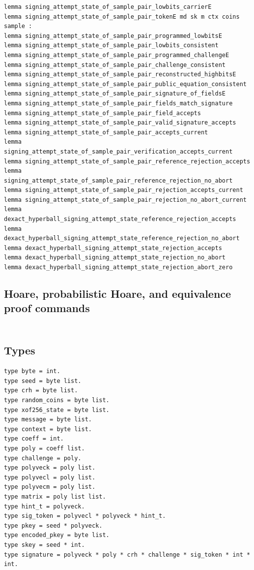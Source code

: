 \begin{lstlisting}[language=EasyCrypt,basicstyle=\ttfamily\tiny]
lemma signing_attempt_state_of_sample_pair_lowbits_carrierE
lemma signing_attempt_state_of_sample_pair_tokenE md sk m ctx coins sample :
lemma signing_attempt_state_of_sample_pair_programmed_lowbitsE
lemma signing_attempt_state_of_sample_pair_lowbits_consistent
lemma signing_attempt_state_of_sample_pair_programmed_challengeE
lemma signing_attempt_state_of_sample_pair_challenge_consistent
lemma signing_attempt_state_of_sample_pair_reconstructed_highbitsE
lemma signing_attempt_state_of_sample_pair_public_equation_consistent
lemma signing_attempt_state_of_sample_pair_signature_of_fieldsE
lemma signing_attempt_state_of_sample_pair_fields_match_signature
lemma signing_attempt_state_of_sample_pair_field_accepts
lemma signing_attempt_state_of_sample_pair_valid_signature_accepts
lemma signing_attempt_state_of_sample_pair_accepts_current
lemma signing_attempt_state_of_sample_pair_verification_accepts_current
lemma signing_attempt_state_of_sample_pair_reference_rejection_accepts
lemma signing_attempt_state_of_sample_pair_reference_rejection_no_abort
lemma signing_attempt_state_of_sample_pair_rejection_accepts_current
lemma signing_attempt_state_of_sample_pair_rejection_no_abort_current
lemma dexact_hyperball_signing_attempt_state_reference_rejection_accepts
lemma dexact_hyperball_signing_attempt_state_reference_rejection_no_abort
lemma dexact_hyperball_signing_attempt_state_rejection_accepts
lemma dexact_hyperball_signing_attempt_state_rejection_no_abort
lemma dexact_hyperball_signing_attempt_state_rejection_abort_zero
\end{lstlisting}

\subsection*{Hoare, probabilistic Hoare, and equivalence proof commands}
\begin{lstlisting}[language=EasyCrypt,basicstyle=\ttfamily\tiny]
\end{lstlisting}

\section*{}

\subsection*{Types}
\begin{lstlisting}[language=EasyCrypt,basicstyle=\ttfamily\tiny]
type byte = int.
type seed = byte list.
type crh = byte list.
type random_coins = byte list.
type xof256_state = byte list.
type message = byte list.
type context = byte list.
type coeff = int.
type poly = coeff list.
type challenge = poly.
type polyveck = poly list.
type polyvecl = poly list.
type polyvecm = poly list.
type matrix = poly list list.
type hint_t = polyveck.
type sig_token = polyvecl * polyveck * hint_t.
type pkey = seed * polyveck.
type encoded_pkey = byte list.
type skey = seed * int.
type signature = polyveck * poly * crh * challenge * sig_token * int * int.
\end{lstlisting}

